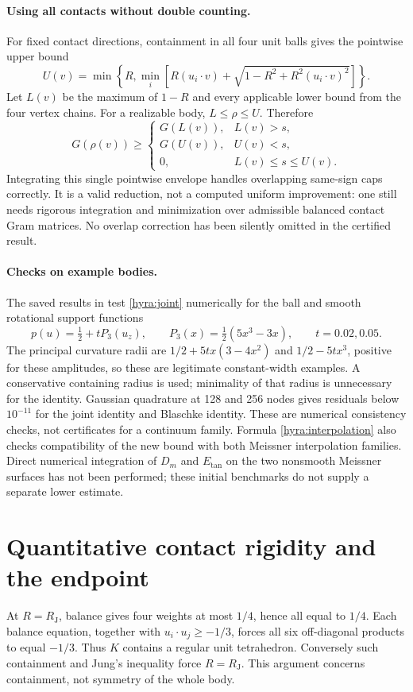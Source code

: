 \documentclass[11pt]{article}
\theoremstyle{remark}\newtheorem{remark}[theorem]{Remark}
\newcommand{\RJ}{R_{\mathrm J}}
\newcommand{\Et}{E_{\mathrm{tan}}}
\begin{document}
\paragraph{Using all contacts without double counting.}
For fixed contact directions, containment in all four unit balls gives the pointwise upper bound
\[
 U(v)=\min\left\{R,\min_i\left[R(u_i\cdot v)+\sqrt{1-R^2+R^2(u_i\cdot v)^2}\right]\right\}.
\]
Let $L(v)$ be the maximum of $1-R$ and every applicable lower bound from the four vertex chains. For a realizable body, $L\leq\rho\leq U$. Therefore
\[
 G(\rho(v))\geq
 \begin{cases}
 G(L(v)),&L(v)>s,\\
 G(U(v)),&U(v)<s,\\
 0,&L(v)\leq s\leq U(v).
 \end{cases}
\]
Integrating this single pointwise envelope handles overlapping same-sign caps correctly. It is a valid reduction, not a computed uniform improvement: one still needs rigorous integration and minimization over admissible balanced contact Gram matrices. No overlap correction has been silently omitted in the certified result.

\paragraph{Checks on example bodies.}
The saved results in  test \eqref{hyra:joint} numerically for the ball and smooth rotational support functions
\[
 p(u)=\tfrac12+tP_3(u_z),\qquad P_3(x)=\tfrac12(5x^3-3x),\qquad t=0.02,0.05.
\]
The principal curvature radii are $1/2+5tx(3-4x^2)$ and $1/2-5tx^3$, positive for these amplitudes, so these are legitimate constant-width examples. A conservative containing radius is used; minimality of that radius is unnecessary for the identity. Gaussian quadrature at 128 and 256 nodes gives residuals below $10^{-11}$ for the joint identity and Blaschke identity. These are numerical consistency checks, not certificates for a continuum family. Formula \eqref{hyra:interpolation} also checks compatibility of the new bound with both Meissner interpolation families. Direct numerical integration of $D_m$ and $\Et$ on the two nonsmooth Meissner surfaces has not been performed; these initial benchmarks do not supply a separate lower estimate.

\section{Quantitative contact rigidity and the endpoint}
At $R=\RJ$, balance gives four weights at most $1/4$, hence all equal to $1/4$. Each balance equation, together with $u_i\cdot u_j\geq-1/3$, forces all six off-diagonal products to equal $-1/3$. Thus $K$ contains a regular unit tetrahedron. Conversely such containment and Jung's inequality force $R=\RJ$. This argument concerns containment, not symmetry of the whole body.
\end{document}
